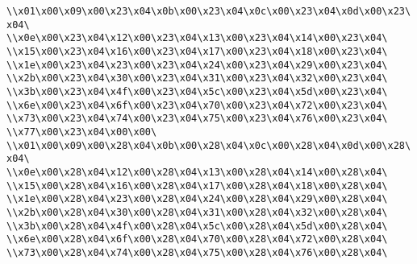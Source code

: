 \verb|\\x01\x00\x09\x00\x23\x04\x0b\x00\x23\x04\x0c\x00\x23\x04\x0d\x00\x23\x04\|\newline
\verb|\\x0e\x00\x23\x04\x12\x00\x23\x04\x13\x00\x23\x04\x14\x00\x23\x04\|\newline
\verb|\\x15\x00\x23\x04\x16\x00\x23\x04\x17\x00\x23\x04\x18\x00\x23\x04\|\newline
\verb|\\x1e\x00\x23\x04\x23\x00\x23\x04\x24\x00\x23\x04\x29\x00\x23\x04\|\newline
\verb|\\x2b\x00\x23\x04\x30\x00\x23\x04\x31\x00\x23\x04\x32\x00\x23\x04\|\newline
\verb|\\x3b\x00\x23\x04\x4f\x00\x23\x04\x5c\x00\x23\x04\x5d\x00\x23\x04\|\newline
\verb|\\x6e\x00\x23\x04\x6f\x00\x23\x04\x70\x00\x23\x04\x72\x00\x23\x04\|\newline
\verb|\\x73\x00\x23\x04\x74\x00\x23\x04\x75\x00\x23\x04\x76\x00\x23\x04\|\newline
\verb|\\x77\x00\x23\x04\x00\x00\|\newline
\verb|\\x01\x00\x09\x00\x28\x04\x0b\x00\x28\x04\x0c\x00\x28\x04\x0d\x00\x28\x04\|\newline
\verb|\\x0e\x00\x28\x04\x12\x00\x28\x04\x13\x00\x28\x04\x14\x00\x28\x04\|\newline
\verb|\\x15\x00\x28\x04\x16\x00\x28\x04\x17\x00\x28\x04\x18\x00\x28\x04\|\newline
\verb|\\x1e\x00\x28\x04\x23\x00\x28\x04\x24\x00\x28\x04\x29\x00\x28\x04\|\newline
\verb|\\x2b\x00\x28\x04\x30\x00\x28\x04\x31\x00\x28\x04\x32\x00\x28\x04\|\newline
\verb|\\x3b\x00\x28\x04\x4f\x00\x28\x04\x5c\x00\x28\x04\x5d\x00\x28\x04\|\newline
\verb|\\x6e\x00\x28\x04\x6f\x00\x28\x04\x70\x00\x28\x04\x72\x00\x28\x04\|\newline
\verb|\\x73\x00\x28\x04\x74\x00\x28\x04\x75\x00\x28\x04\x76\x00\x28\x04\|\newline
